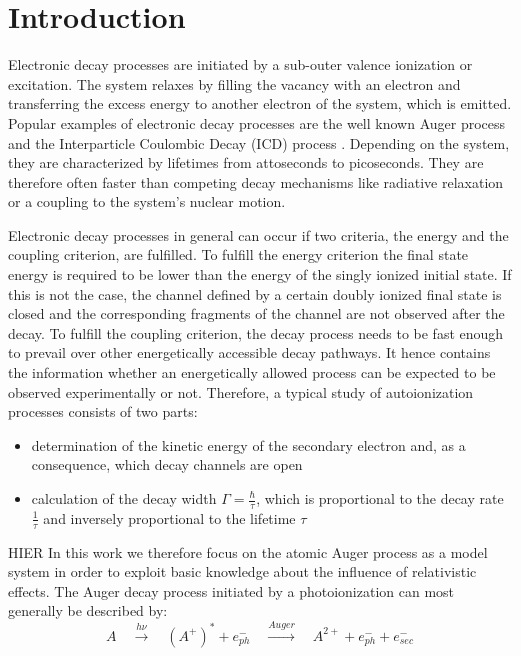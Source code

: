\section{Introduction}
Electronic decay processes are initiated by a sub-outer valence ionization
or excitation. The system relaxes by filling the vacancy with an electron and
transferring the excess energy to another electron of the system, which is emitted.
Popular examples of electronic decay processes are the
well known Auger process \cite{Meitner22,Auger23} and the Interparticle
Coulombic Decay (ICD) process \cite{Cederbaum97,Marburger03}.
Depending on the system, they are characterized by lifetimes from attoseconds
to picoseconds. They are therefore often faster than competing decay mechanisms
like radiative relaxation or a coupling to the system's nuclear motion.

Electronic decay processes in general can occur if
two criteria, the energy and the coupling criterion,
are fulfilled. To fulfill the energy criterion the final state energy is required
to be lower than
the energy of the singly ionized initial state. If this is not the case, the
channel defined by a certain doubly ionized final state
is closed and the corresponding fragments of the
channel are not observed after the decay.
To fulfill the coupling criterion, the decay process needs to be fast enough
to prevail over other energetically accessible decay pathways.
It hence contains
the information whether an energetically allowed process can be expected
to be observed experimentally or not.
Therefore, a typical study of autoionization processes consists of two parts:
\begin{itemize}
 \item determination of the kinetic energy of the secondary electron
       and, as a consequence, which decay channels are open
 \item calculation of the decay width $\Gamma=\frac{\hbar}{\tau}$, which
       is proportional to the decay rate $\frac{1}{\tau}$ and
       inversely proportional to the lifetime $\tau$
\end{itemize}

HIER
In this work we therefore focus on the atomic Auger process     
as a model system in order                                      
to exploit basic knowledge about the influence of relativistic effects.       
The Auger decay process initiated by a photoionization          
can most generally be described by:                             
\begin{equation*}                                               
 A \quad \xrightarrow{h\nu}\quad (A^+)^* + e^-_{ph} \quad       
    \xrightarrow{Auger} \quad A^{2+} + e^-_{ph} + e^-_{sec}     
\end{equation*}                                                 
                                                                
